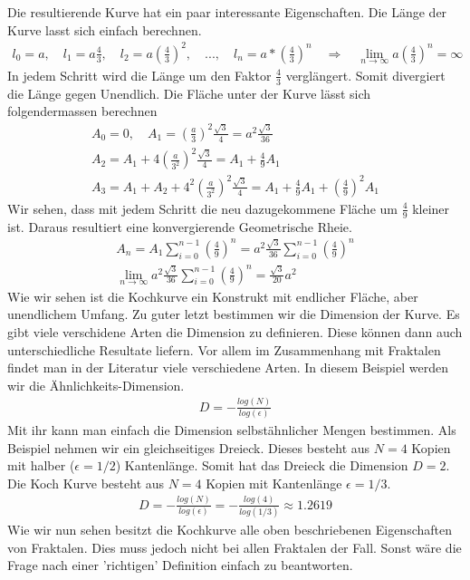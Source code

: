 Die resultierende Kurve hat ein paar interessante Eigenschaften.
Die Länge der Kurve lasst sich einfach berechnen.
\begin{align*}
	l_0 = a ,\quad l_1 = a  \frac{4}{3} ,\quad l_2 = a  \left( \frac{4}{3}\right)^2 , \quad ... , \quad
	l_n = a * \left( \frac{4}{3}\right)^n \quad
	\Rightarrow \quad
	\lim_{n\to\infty} a  \left( \frac{4}{3}\right)^n = \infty
\end{align*}
In jedem Schritt wird die Länge um den Faktor $\frac{4}{3}$ verglängert. Somit divergiert die Länge gegen Unendlich. 
Die Fläche unter der Kurve lässt sich folgendermassen berechnen
\begin{align*}
	A_0 = 0 , \quad A_1 = \left( \frac{a}{3}\right)^2 \frac{\sqrt{3}}{4} = a^2 \frac{\sqrt{3}}{36}\\
	A_2 = A_1 + 4\left( \frac{a}{3^2}\right)^2 \frac{\sqrt{3}}{4} = A_1 + \frac{4}{9} A_1 \\ 
	A_3 = A_1 + A_2 + 4^2 \left( \frac{a}{3^2}\right)^2 \frac{\sqrt{3}}{4} = A_1 + \frac{4}{9} A_1 + \left( \frac{4}{9}\right)^2 A_1	 
\end{align*}
Wir sehen, dass mit jedem Schritt die neu dazugekommene Fläche um $\frac{4}{9}$ kleiner ist.
Daraus resultiert eine konvergierende Geometrische Rheie.
\begin{align*}
	A_n = A_1 \sum_{i = 0}^{n-1} \left( \frac{4}{9}\right)^n =  a^2 \frac{\sqrt{3}}{36} \sum_{i = 0}^{n-1} \left( \frac{4}{9}\right)^n \\
	\lim_{n\to\infty} a^2 \frac{\sqrt{3}}{36} \sum_{i = 0}^{n-1} \left( \frac{4}{9}\right)^n = \frac{\sqrt{3}}{20} a^2
\end{align*}
Wie wir sehen ist die Kochkurve ein Konstrukt mit endlicher Fläche, aber unendlichem Umfang.
Zu guter letzt bestimmen wir die Dimension der Kurve. 
Es gibt viele verschidene Arten die Dimension zu definieren. Diese können dann auch unterschiedliche Resultate liefern.
Vor allem im Zusammenhang mit Fraktalen findet man in der Literatur viele verschiedene Arten.
In diesem Beispiel werden wir die Ähnlichkeits-Dimension.
\begin{align*}
	D = - \frac{log(N)}{log(\epsilon)}
\end{align*}
Mit ihr kann man einfach die Dimension selbstähnlicher Mengen bestimmen.
Als Beispiel nehmen wir ein gleichseitiges Dreieck. Dieses besteht aus $N = 4$ Kopien mit halber ($\epsilon = 1/2$) Kantenlänge.
Somit hat das Dreieck die Dimension $D = 2$.
Die Koch Kurve besteht aus $N = 4$ Kopien mit Kantenlänge $\epsilon = 1/3$.
\begin{align*}
	D = - \frac{log(N)}{log(\epsilon)} = - \frac{log(4)}{log(1/3)} \approx 1.2619
\end{align*}
Wie wir nun sehen besitzt die Kochkurve alle oben beschriebenen Eigenschaften von Fraktalen. 
Dies muss jedoch nicht bei allen Fraktalen der Fall. Sonst wäre die Frage nach einer 'richtigen' Definition einfach zu beantworten.

